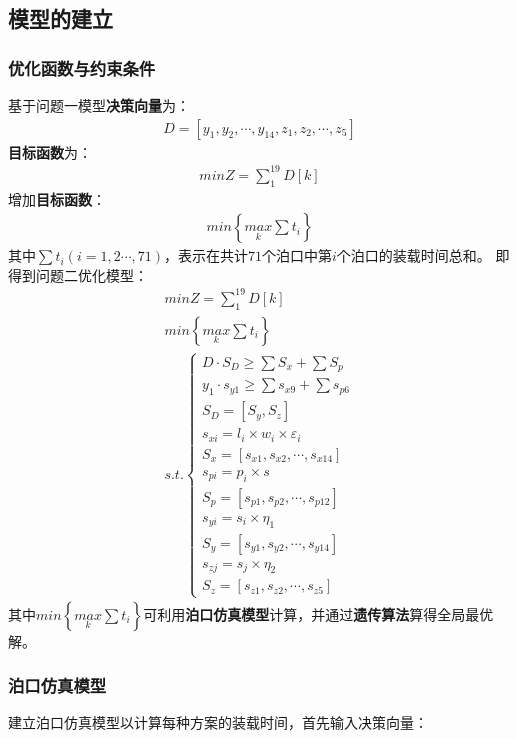 \documentclass{whutmod}
\begin{document}
	\subsection{模型的建立}
	    \subsubsection{优化函数与约束条件}
	基于问题一模型\textbf{决策向量}为：
	\begin{gather}
	D=[y_{1},y_{2},\cdots,y_{14},z_{1},z_{2},\cdots,z_{5}]
	\end{gather}
	\textbf{目标函数}为：
	\begin{gather}
	min Z=\sum _{1}^{19}D[k]
	\end{gather}
	增加\textbf{目标函数}：
		\begin{gather}
	min \left \{ \underset{k}{max}\sum t_{i} \right \}
	\end{gather}
	其中$\sum t_{i}(i=1,2\cdots,71)$，表示在共计$71$个泊口中第$i$个泊口的装载时间总和。
	即得到问题二优化模型：
	\begin{gather}
	min Z=\sum _{1}^{19}D[k]\\
	min \left \{ \underset{k}{max}\sum t_{i} \right \}\\
	s.t.\left\{\begin{matrix}	 D\cdot S_{D}\geq \sum  S_{x} + \sum  S_{p}
	\\ y_{1}\cdot s_{y1}\geq \sum s_{x9}+ \sum  s_{p6}
	\\S_{D}=[S_{y}, S_{z}]
	\\ s_{xi}=l_{i}\times w_{i} \times \varepsilon _{i}
	\\S_{x}=[s_{x1},s_{x2},\cdots,s_{x14}]
	\\s_{pi}=p_{i}\times s
	\\S_{p}=[s_{p1},s_{p2},\cdots,s_{p12}]
	\\     s_{yi}=s_{i}\times \eta_{1}
	\\   S_{y}=[s_{y1},s_{y2},\cdots,s_{y14}]
	\\      s_{zj}=s_{j}\times \eta_{2}
	\\ S_{z}=[s_{z1},s_{z2},\cdots,s_{z5}]
	\end{matrix}\right. 
	\end{gather}
	其中$min \left \{ \underset{k}{max}\sum t_{i} \right \}$可利用\textbf{泊口仿真模型}计算，并通过\textbf{遗传算法}算得全局最优解。
	\subsubsection{泊口仿真模型}
	建立泊口仿真模型以计算每种方案的装载时间，首先输入决策向量：
\end{document}
